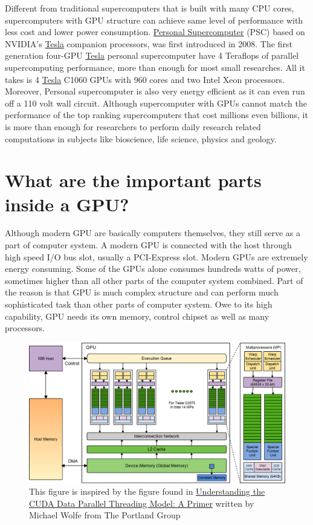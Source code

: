 \documentclass[letterpaper,10pt,openany,oneside]{sphinxmanual}
\begin{document}
Different from traditional supercomputers that is built with many CPU cores, supercomputers with GPU structure can achieve same level of performance with less cost and lower power consumption. \href{http://en.wikipedia.org/wiki/Nvidia\_Tesla\_\_Personal\_Supercomputer}{Personal Supercomputer} (PSC) based on NVIDIA's \href{http://www.nvidia.com/object/tesla-supercomputing-solutions.html}{Tesla} companion processors, was first introduced in 2008. The first generation four-GPU \href{http://www.nvidia.com/object/tesla-supercomputing-solutions.html}{Tesla} personal supercomputer have 4 Teraflops of parallel supercomputing performance, more than enough for most small researches. All it takes is 4 \href{http://www.nvidia.com/object/tesla-supercomputing-solutions.html}{Tesla} C1060 GPUs with 960 cores and two Intel Xeon processors. Moreover, Personal supercomputer is also very energy efficient as it can even run off a 110 volt wall circuit. Although supercomputer with GPUs cannot match the performance of the top ranking supercomputers that cost millions even billions, it is more than enough for researchers to perform daily research related computations in subjects like bioscience, life science, physics and geology.


\section{What are the important parts inside a GPU?}
\label{Introduction/Introduction:tesla}\label{Introduction/Introduction:what-are-the-important-parts-inside-a-gpu}
Although modern GPU are basically computers themselves, they still serve as a part of computer system. A modern GPU is connected with the host through high speed I/O bus slot, usually a PCI-Express slot. Modern GPUs are extremely energy consuming. Some of the GPUs alone consumes hundreds watts of power, sometimes higher than all other parts of the computer system combined. Part of the reason is that GPU is much complex  structure and can perform much sophisticated task than other parts of computer system. Owe to its high capability, GPU needs its own memory, control chipset as well as many processors.
\begin{figure}[htbp]
\centering
\capstart

\includegraphics{CUDA.png}
\caption{This figure is inspired by the figure found in \href{http://www.pgroup.com/lit/articles/insider/v2n1a5.htm}{Understanding the CUDA Data Parallel Threading Model: A Primer} written by Michael Wolfe from The Portland Group}\end{figure}
\end{document}
